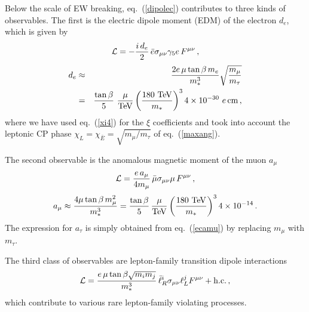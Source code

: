 \documentclass[a4paper,12pt]{article}
\newcommand{\hc}{{\rm h.c.}}
\newcommand{\bea}{\begin{eqnarray}}
\newcommand{\eea}{\end{eqnarray}}
\newcommand{\beq}{\begin{equation}}
\newcommand{\eeq}{\end{equation}}
\def\eq#1{eq.~(\ref{#1})}
\def\eq#1{eq.~(\ref{#1})}
\def\mst{m_*}
\begin{document}
Below the scale of EW breaking, \eq{dipolec} contributes to three kinds of observables. The first is the electric dipole moment (EDM) of the electron $d_e$, which is given by
\beq
{\cal L} = -\frac{i\,d_e}{2}\, {\bar e} \sigma_{\mu \nu} \gamma_5 e \, F^{\mu \nu} \, , 
\eeq
\bea
d_e &\approx& \frac{2 e \, \mu\tan\beta\, m_e}{\mst^3} \sqrt{\frac{m_\mu}{m_\tau}}
\nonumber
 \\
&=& \frac{\tan\beta}{5} \, \,  \frac{\mu}{\rm TeV}\left( \frac{180~{\rm TeV}}{\mst}\right)^3 4\times 10^{-30}~ e\,{\rm cm} \, ,
\label{EDMel}
\eea
where we have used \eq{xi4} for the $\xi$ coefficients and took into account the leptonic CP phase $\chi_L=\chi_{\bar E}= \sqrt{m_\mu/m_\tau}$ of \eq{maxang}. 

The second observable is the anomalous magnetic moment of the muon $a_\mu$
\beq
{\cal L} = \frac{e\, a_\mu}{4m_\mu}\, {\bar \mu} \sigma_{\mu \nu} \mu\, F^{\mu \nu} \, ,
\eeq
\beq
a_\mu \approx \frac{4  \mu\tan\beta\, m_\mu^2}{\mst^3} 
= \frac{\tan\beta}{5} \, \frac{\mu}{\rm TeV}\left( \frac{180~{\rm TeV}}{\mst}\right)^3 4\times 10^{-14}
 \, .
 \label{ecamu}
 \eeq
 The expression for $a_\tau$ is simply obtained from \eq{ecamu} by replacing $m_\mu$ with $m_\tau$.
 

The third class of observables are lepton-family transition dipole interactions
\beq
{\cal L} = \frac{e\, \mu\tan\beta \sqrt{m_i m_j}}{\mst^3} \, {\bar \ell^i_R} \sigma_{\mu \nu}  \ell^j_L F^{\mu \nu} + \hc \, , 
\eeq
which contribute to various rare lepton-family violating processes.
\end{document}
